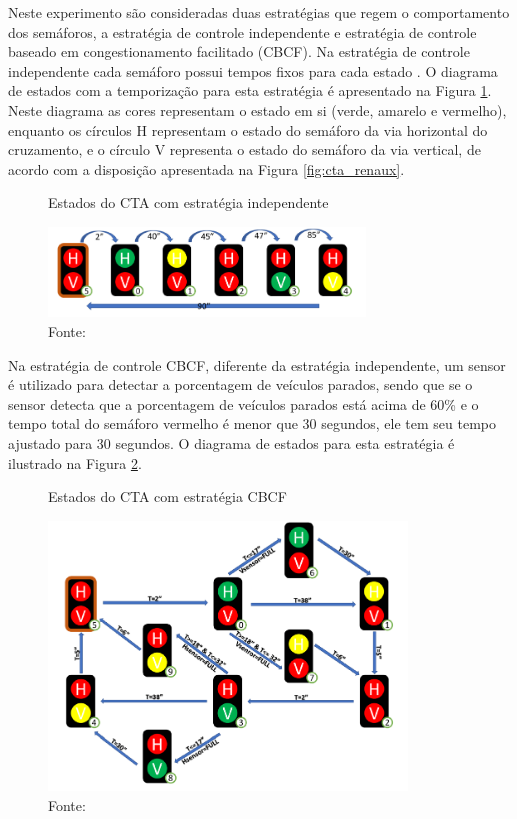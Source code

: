 Neste experimento são consideradas duas estratégias que regem o comportamento
dos semáforos, a estratégia de controle independente e estratégia de controle
baseado em congestionamento facilitado (CBCF). Na estratégia de controle
independente cada semáforo possui tempos fixos para cada estado
\cite{msc_negrini_2019}. O diagrama de estados com a temporização para esta
estratégia é apresentado na Figura \ref{fig:estados_cta}. Neste diagrama as
cores representam o estado em si (verde, amarelo e vermelho), enquanto os
círculos H representam o estado do semáforo da via horizontal do cruzamento, e o
círculo V representa o estado  do semáforo da via vertical, de acordo com a
disposição apresentada na Figura \ref{fig:cta_renaux}.

\begin{figure}[!htb]
\centering
\caption{Estados do CTA com estratégia independente}
\smallskip
\includegraphics[width=0.75\textwidth]{../figures/estados_cta.png}
\caption*{Fonte: }
\label{fig:estados_cta}
\end{figure}

\FloatBarrier

Na estratégia de controle CBCF, diferente da estratégia independente, um sensor
é utilizado para detectar a porcentagem de veículos parados, sendo que se o
sensor detecta que a porcentagem de veículos parados está acima de 60\% e o
tempo total do semáforo vermelho é menor que 30 segundos, ele tem seu tempo
ajustado para 30 segundos. O diagrama de estados para esta estratégia é
ilustrado na Figura \ref{fig:estados_cbcf}.

\begin{figure}[!htb]
\centering
\caption{Estados do CTA com estratégia CBCF}
\smallskip
\includegraphics[width=0.85\textwidth]{../figures/estados_cbcf.png}
\caption*{Fonte: }
\label{fig:estados_cbcf}
\end{figure}

